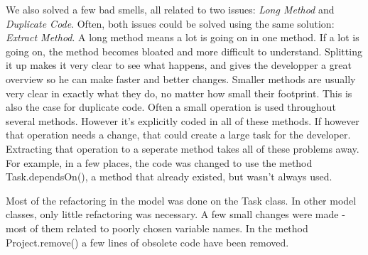 We also solved a few bad smells, all related to two issues: \emph{Long Method} and
\emph{Duplicate Code}. Often, both issues could be solved using the
same solution: \emph{Extract Method}.
A long method means a lot is going on in one method. If a lot is going on, the
method becomes bloated and more difficult to understand.
Splitting it up makes it very clear to see what happens, and gives the
developper a great overview so he can make faster and better changes.
Smaller methods are usually very clear in exactly what they do, no matter how
small their footprint.
This is also the case for duplicate code. Often a small operation is used
throughout several methods. However it's explicitly coded in all of these
methods.
If however that operation needs a change, that could create a large task for the
developer.
Extracting that operation to a seperate method takes all of these problems away.
For example, in a few places, the code was changed to use the method Task.dependsOn(), a method that already existed, but wasn't always used.

Most of the refactoring in the model was done on the Task class. In other model classes, only little refactoring was necessary. A few small changes were made - most of them related to poorly chosen variable names. 
In the method Project.remove() a few lines of obsolete code have been removed.
